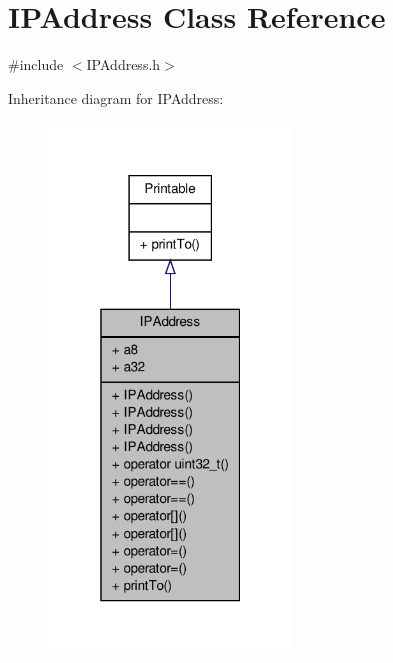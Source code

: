 \hypertarget{class_i_p_address}{\section{I\-P\-Address Class Reference}
\label{class_i_p_address}
}


{\ttfamily \#include $<$I\-P\-Address.\-h$>$}



Inheritance diagram for I\-P\-Address\-:
\nopagebreak
\begin{figure}[H]
\begin{center}
\leavevmode
\includegraphics[width=184pt]{class_i_p_address__inherit__graph}
\end{center}
\end{figure}



